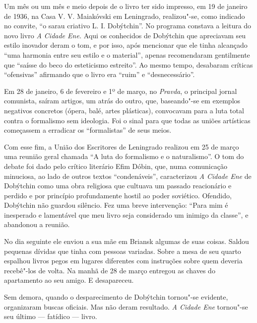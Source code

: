 Um mês ou um mês e meio depois de o livro ter sido impresso, em 19 de
janeiro de 1936, na Casa V. V. Maiakóvski em Leningrado, realizou"-se,
como indicado no convite, ``o sarau criativo L. I. Dobýtchin''. No
programa constava a leitura do novo livro \emph{A Cidade Ene.} Aqui os
conhecidos de Dobýtchin que apreciavam seu estilo inovador deram o tom,
e por isso, após mencionar que ele tinha alcançado ``uma harmonia entre
seu estilo e o material'', apenas recomendaram gentilmente que ``saísse
do beco do esteticismo estreito''. Ao mesmo tempo, desabaram críticas
``ofensivas'' afirmando que o livro era ``ruim'' e ``desnecessário''.

Em 28 de janeiro, 6 de fevereiro e 1º de março, no \emph{Pravda}, o
principal jornal comunista, saíram artigos, um atrás do outro, que,
baseando"-se em exemplos negativos concretos (ópera, balé, artes
plásticas), convocavam para a luta total contra o formalismo sem
ideologia. Foi o sinal para que todas as uniões artísticas começassem a
erradicar os ``formalistas'' de seus meios.

Com esse fim, a União dos Escritores de Leningrado realizou em 25 de
março uma reunião geral chamada ``A luta do formalismo e o
naturalismo''. O tom do debate foi dado pelo crítico literário Efim
Dóbin, que, numa comunicação minuciosa, ao lado de outros textos
``condenáveis'', caracterizou \emph{A Cidade Ene} de Dobýtchin como uma
obra religiosa que cultuava um passado reacionário e perdido e por
princípio profundamente hostil ao poder soviético. Ofendido, Dobýtchin
não guardou silêncio. Fez uma breve intervenção: ``Para mim é inesperado
e lamentável que meu livro seja considerado um inimigo da classe'', e
abandonou a reunião.

No dia seguinte ele enviou a sua mãe em Briansk algumas de suas coisas.
Saldou pequenas dívidas que tinha com pessoas variadas. Sobre a mesa de
seu quarto espalhou livros pegos em lugares diferentes com instruções
sobre quem deveria recebê"-los de volta. Na manhã de 28 de março entregou
as chaves do apartamento ao seu amigo. E desapareceu.

Sem demora, quando o desparecimento de Dobýtchin tornou"-se evidente,
organizaram buscas oficiais. Mas não deram resultado. \emph{A Cidade
Ene} tornou"-se seu último --- fatídico --- livro.

\pagebreak
